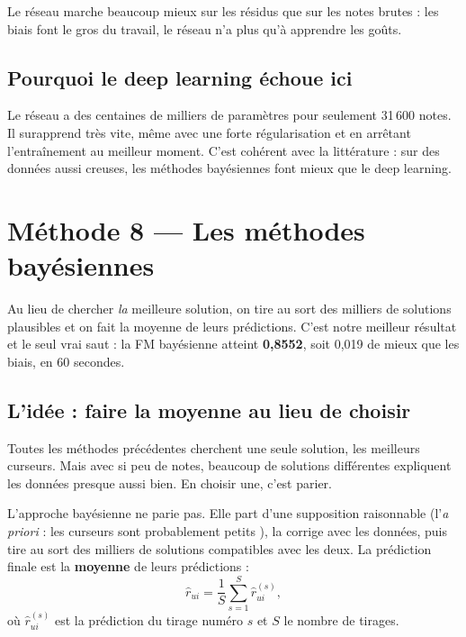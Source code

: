\documentclass[11pt,a4paper]{article}
\newcommand{\rhat}{\hat r}
\begin{document}
Le réseau marche beaucoup mieux sur les résidus que sur les notes brutes : les biais
font le gros du travail, le réseau n'a plus qu'à apprendre les goûts.

\subsection{Pourquoi le deep learning échoue ici}

Le réseau a des centaines de milliers de paramètres pour seulement 31\,600 notes. Il
surapprend très vite, même avec une forte régularisation et en arrêtant l'entraînement
au meilleur moment. C'est cohérent avec la littérature : sur des données aussi creuses,
les méthodes bayésiennes font mieux que le deep learning.

\section{Méthode 8 --- Les méthodes bayésiennes}\label{sec:bayes}

\begin{enbref}
Au lieu de chercher \emph{la} meilleure solution, on tire au sort des milliers de
solutions plausibles et on fait la moyenne de leurs prédictions. C'est notre meilleur
résultat et le seul vrai saut : la FM bayésienne atteint \textbf{0,8552}, soit 0,019 de
mieux que les biais, en 60 secondes.
\end{enbref}

\subsection{L'idée : faire la moyenne au lieu de choisir}

Toutes les méthodes précédentes cherchent une seule solution, les \og meilleurs \fg
curseurs. Mais avec si peu de notes, beaucoup de solutions différentes expliquent les
données presque aussi bien. En choisir une, c'est parier.

L'approche bayésienne ne parie pas. Elle part d'une supposition raisonnable (l'\emph{a
priori} : \og les curseurs sont probablement petits \fg), la corrige avec les données,
puis tire au sort des milliers de solutions compatibles avec les deux. La prédiction
finale est la \textbf{moyenne} de leurs prédictions :
\[
  \rhat_{ui} = \frac{1}{S} \sum_{s=1}^{S} \rhat^{(s)}_{ui} ,
\]
où $\rhat^{(s)}_{ui}$ est la prédiction du tirage numéro $s$ et $S$ le nombre de tirages.
\end{document}
